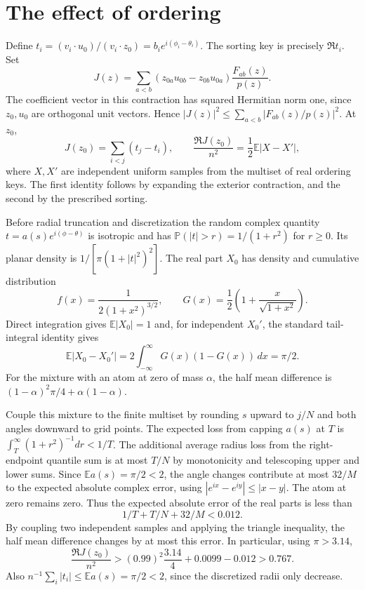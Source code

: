 \documentclass[11pt]{article}
\newcommand{\E}{\mathbb E}
\newcommand{\Prb}{\mathbb P}
\begin{document}
\section{The effect of ordering}
Define $t_i=(v_i\cdot u_0)/(v_i\cdot z_0)=b_i e^{i(\phi_i-\theta_i)}$. The sorting key is precisely $\Re t_i$. Set
\[
 J(z)=\sum_{a<b}(z_{0a}u_{0b}-z_{0b}u_{0a})\frac{F_{ab}(z)}{p(z)}.
\]
The coefficient vector in this contraction has squared Hermitian norm one, since $z_0,u_0$ are orthogonal unit vectors. Hence $|J(z)|^2\le\sum_{a<b}|F_{ab}(z)/p(z)|^2$. At $z_0$,
\begin{equation}\label{J}
 J(z_0)=\sum_{i<j}(t_j-t_i),\qquad \frac{\Re J(z_0)}{n^2}=\frac12\E|X-X'|,
\end{equation}
where $X,X'$ are independent uniform samples from the multiset of real ordering keys. The first identity follows by expanding the exterior contraction, and the second by the prescribed sorting.

Before radial truncation and discretization the random complex quantity $t=a(s)e^{i(\phi-\theta)}$ is isotropic and has $\Prb(|t|>r)=1/(1+r^2)$ for $r\ge0$. Its planar density is $1/[\pi(1+|t|^2)^2]$. The real part $X_0$ has density and cumulative distribution
\[
 f(x)=\frac1{2(1+x^2)^{3/2}},\qquad G(x)=\frac12\left(1+\frac{x}{\sqrt{1+x^2}}\right).
\]
Direct integration gives $\E|X_0|=1$ and, for independent $X_0'$, the standard tail-integral identity gives
\[
 \E|X_0-X_0'|=2\int_{-\infty}^{\infty}G(x)(1-G(x))\,dx=\pi/2.
\]
For the mixture with an atom at zero of mass $\alpha$, the half mean difference is $(1-\alpha)^2\pi/4+\alpha(1-\alpha)$.

Couple this mixture to the finite multiset by rounding $s$ upward to $j/N$ and both angles downward to grid points. The expected loss from capping $a(s)$ at $T$ is $\int_T^\infty (1+r^2)^{-1}dr<1/T$. The additional average radius loss from the right-endpoint quantile sum is at most $T/N$ by monotonicity and telescoping upper and lower sums. Since $\E a(s)=\pi/2<2$, the angle changes contribute at most $32/M$ to the expected absolute complex error, using $|e^{ix}-e^{iy}|\le|x-y|$. The atom at zero remains zero. Thus the expected absolute error of the real parts is less than
\[
 1/T+T/N+32/M<0.012.
\]
By coupling two independent samples and applying the triangle inequality, the half mean difference changes by at most this error. In particular, using $\pi>3.14$,
\begin{equation}\label{ginibound}
 \frac{\Re J(z_0)}{n^2}>(0.99)^2\frac{3.14}{4}+0.0099-0.012>0.767.
\end{equation}
Also $n^{-1}\sum_i|t_i|\le\E a(s)=\pi/2<2$, since the discretized radii only decrease.
\end{document}
